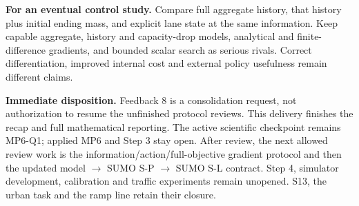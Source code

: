 \documentclass[11pt,a4paper]{article}
\begin{document}
\textbf{For an eventual control study.} Compare full aggregate history,
that history plus initial ending mass, and explicit lane state at the same
information. Keep capable aggregate, history and capacity-drop models,
analytical and finite-difference gradients, and bounded scalar search as
serious rivals. Correct differentiation, improved internal cost and external
policy usefulness remain different claims.

\textbf{Immediate disposition.} Feedback 8 is a consolidation request, not
authorization to resume the unfinished protocol reviews. This delivery
finishes the recap and full mathematical reporting. The active scientific
checkpoint remains MP6-Q1; applied MP6 and Step 3 stay open. After review,
the next allowed review work is the information/action/full-objective
gradient protocol and then the updated model $\to$ SUMO S-P $\to$ SUMO S-L
contract. Step 4, simulator development, calibration and traffic experiments
remain unopened. S13, the urban task and the ramp line retain their closure.
\end{document}
